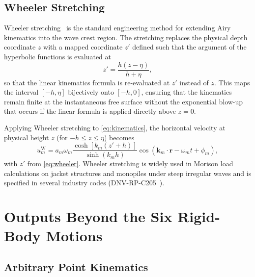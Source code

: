 \documentclass[journal,10pt,twocolumn]{IEEEtran}
\newcommand{\vect}[1]{\bm{#1}}
\begin{document}
    \subsection{Wheeler Stretching}
    \label{sec:wheeler}

    Wheeler stretching~\cite{Wheeler} is the standard engineering method for extending
    Airy kinematics into the wave crest region.
    The stretching replaces the physical depth coordinate $z$ with a mapped coordinate
    $z'$ defined such that the argument of the hyperbolic functions is evaluated at
    \begin{equation}
        z' = \frac{h(z-\eta)}{h+\eta},
        \label{eq:wheeler}
    \end{equation}
    so that the linear kinematics formula is re-evaluated at $z'$ instead of $z$.
    This maps the interval $[-h,\eta]$ bijectively onto $[-h,0]$, ensuring that the
    kinematics remain finite at the instantaneous free surface without the exponential
    blow-up that occurs if the linear formula is applied directly above $z=0$.

    Applying Wheeler stretching to \eqref{eq:kinematics}, the horizontal velocity at
    physical height $z$ (for $-h\le z\le\eta$) becomes
    \begin{equation}
        u_m^{\mathrm{W}}
        = a_m\omega_m
        \frac{\cosh[k_m(z'+h)]}{\sinh(k_m h)}
        \cos(\vect{k}_m\cdot\vect{r}-\omega_m t+\phi_m),
        \label{eq:wheeler_u}
    \end{equation}
    with $z'$ from \eqref{eq:wheeler}.
    Wheeler stretching is widely used in Morison load calculations on jacket structures and
    monopiles under steep irregular waves and is specified in several industry codes
    (DNV-RP-C205~\cite{DNVGL}).

    \section{Outputs Beyond the Six Rigid-Body Motions}
    \label{sec:outputs}

    \subsection{Arbitrary Point Kinematics}
    \label{sec:pointmotion}
\end{document}
